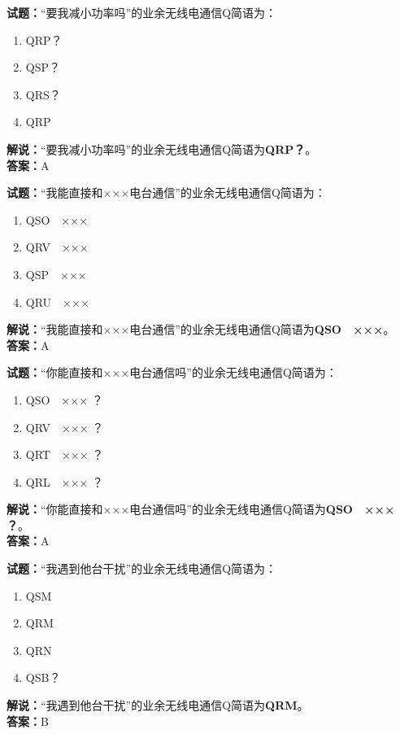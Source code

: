 \documentclass{ctexbook}
\begin{document}
\vspace{1em}

\textbf{试题：}“要我减小功率吗”的业余无线电通信Q简语为：
\begin{enumerate}[leftmargin=3em]
  \item QRP？
  \item QSP？
  \item QRS？
  \item QRP
\end{enumerate}
\noindent\textbf{解说：}“要我减小功率吗”的业余无线电通信Q简语为\textbf{QRP？}。\\\noindent\textbf{答案：}A

\vspace{1em}

\textbf{试题：}“我能直接和×××电台通信”的业余无线电通信Q简语为：
\begin{enumerate}[leftmargin=3em]
  \item QSO　×××
  \item QRV　×××
  \item QSP　×××
  \item QRU　×××
\end{enumerate}
\noindent\textbf{解说：}“我能直接和×××电台通信”的业余无线电通信Q简语为\textbf{QSO　×××}。\\\noindent\textbf{答案：}A

\vspace{1em}

\textbf{试题：}“你能直接和×××电台通信吗”的业余无线电通信Q简语为：
\begin{enumerate}[leftmargin=3em]
  \item QSO　××× ？
  \item QRV　××× ？
  \item QRT　××× ？
  \item QRL　××× ？
\end{enumerate}
\noindent\textbf{解说：}“你能直接和×××电台通信吗”的业余无线电通信Q简语为\textbf{QSO　××× ？}。\\\noindent\textbf{答案：}A

\vspace{1em}

\textbf{试题：}“我遇到他台干扰”的业余无线电通信Q简语为：
\begin{enumerate}[leftmargin=3em]
  \item QSM
  \item QRM
  \item QRN
  \item QSB？
\end{enumerate}
\noindent\textbf{解说：}“我遇到他台干扰”的业余无线电通信Q简语为\textbf{QRM}。\\\noindent\textbf{答案：}B
\end{document}

